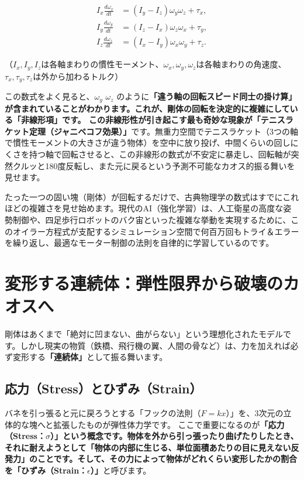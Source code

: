 \[
\begin{aligned}
I_x \frac{d\omega_x}{dt} &= (I_y - I_z)\omega_y\omega_z + \tau_x,\\
I_y \frac{d\omega_y}{dt} &= (I_z - I_x)\omega_z\omega_x + \tau_y,\\
I_z \frac{d\omega_z}{dt} &= (I_x - I_y)\omega_x\omega_y + \tau_z.
\end{aligned}
\]

（\(I_x, I_y, I_z\)は各軸まわりの慣性モーメント、\(\omega_x, \omega_y, \omega_z\)は各軸まわりの角速度、\(\tau_x, \tau_y, \tau_z\)は外から加わるトルク）

この数式をよく見ると、\ensuremath{\omega_y} \ensuremath{\omega_z} のように\textbf{「違う軸の回転スピード同士の掛け算」が含まれていることがわかります。これが、剛体の回転を決定的に複雑にしている「非線形項」です。 この非線形性が引き起こす最も奇妙な現象が「テニスラケット定理（ジャニベコフ効果）」}です。無重力空間でテニスラケット（3つの軸で慣性モーメントの大きさが違う物体）を空中に放り投げ、中間くらいの回しにくさを持つ軸で回転させると、この非線形の数式が不安定に暴走し、回転軸が突然クルッと180度反転し、また元に戻るという予測不可能なカオス的振る舞いを見せます。

たった一つの固い塊（剛体）が回転するだけで、古典物理学の数式はすでにこれほどの複雑さを見せ始めます。現代のAI（強化学習）は、人工衛星の高度な姿勢制御や、四足歩行ロボットのバク宙といった複雑な挙動を実現するために、このオイラー方程式が支配するシミュレーション空間で何百万回もトライ＆エラーを繰り返し、最適なモーター制御の法則を自律的に学習しているのです。

\section{変形する連続体：弾性限界から破壊のカオスへ}

剛体はあくまで「絶対に凹まない、曲がらない」という理想化されたモデルです。しかし現実の物質（鉄橋、飛行機の翼、人間の骨など）は、力を加えれば必ず変形する\textbf{「連続体」}として振る舞います。

\subsection{応力（Stress）とひずみ（Strain）}

バネを引っ張ると元に戻ろうとする「フックの法則（\(F=kx\)）」を、3次元の立体的な塊へと拡張したものが弾性体力学です。 ここで重要になるのが\textbf{「応力（Stress：\ensuremath{\sigma}）」という概念です。物体を外から引っ張ったり曲げたりしたとき、それに耐えようとして「物体の内部に生じる、単位面積あたりの目に見えない反発力」のことです。そして、その力によって物体がどれくらい変形したかの割合を「ひずみ（Strain：\ensuremath{\epsilon}）」}と呼びます。

